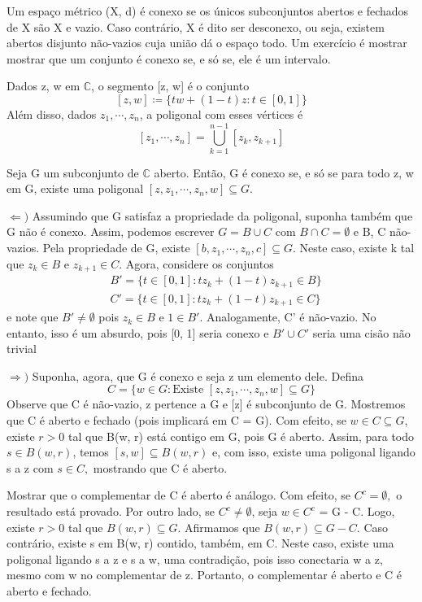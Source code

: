\documentclass[complex.tex]{subfiles}
\begin{document}
Um espaço métrico (X, d) é conexo se os únicos subconjuntos abertos e fechados de X são X e vazio. Caso contrário,
X é dito ser desconexo, ou seja, existem abertos disjunto não-vazios cuja união dá o espaço todo. Um exercício é mostrar
mostrar que um conjunto é conexo se, e só se, ele é um intervalo.

Dados z, w em $\mathbb{C}$, o segmento [z, w] é o conjunto
$$
	[z, w]\coloneqq  \{tw + (1-t)z: t\in[0, 1]\}
$$
Além disso, dados $z _{1}, \cdots, z _{n}$, a poligonal com esses vértices é
$$
	[z _{1}, \cdots, z _{n}] = \bigcup _{k=1}^{n-1}[z _{k}, z _{k+1}]
$$
\begin{prop*}
	Seja G um subconjunto de $\mathbb{C}$ aberto. Então, G é conexo se, e só se para todo z, w em G, existe uma poligonal
	$[z, z _{1}, \cdots, z _{n}, w]\subseteq{G}.$
\end{prop*}
\begin{proof*}
	$\Leftarrow)$ Assumindo que G satisfaz a propriedade da poligonal, suponha também que G não é conexo. Assim,
	podemos escrever $G = B\cup{C}$ com $B\cap{C}=\emptyset$ e B, C não-vazios. Pela propriedade de G, existe
	$[b, z _{1}, \cdots, z _{n}, c]\subseteq{G}$. Neste caso, existe k tal que $z _{k}\in{B}$ e $z _{k+1}\in{C}.$ Agora,
	considere os conjuntos
	\begin{align*}
		 & B' = \{t\in[0, 1]: tz _{k} + (1 - t)z _{k+1}\in{B}\} \\
		 & C' = \{t\in[0, 1]: tz _{k} + (1 - t)z _{k+1}\in{C}\}
	\end{align*}
	e note que $B'\neq{\emptyset}$ pois $z _{k}\in{B}$ e $1\in{B'}$. Analogamente, C' é não-vazio. No entanto, isso é um absurdo,
	pois [0, 1] seria conexo e $B'\cup{C'}$ seria uma cisão não trivial

	$\Rightarrow)$ Suponha, agora, que G é conexo e seja z um elemento dele. Defina
	$$
		C = \{w\in{G}: \text{Existe } [z, z _{1}, \cdots, z _{n}, w]\subseteq{G}\}
	$$
	Observe que C é não-vazio, z pertence a G e [z] é subconjunto de G. Mostremos que C é aberto e fechado (pois implicará em C = G).
	Com efeito, se $w\in{C}\subseteq{G}$, existe $r>0$ tal que B(w, r) está contigo em G, pois G é aberto.
	Assim, para todo $s\in B(w, r)$, temos $[s, w]\subseteq{B(w, r)}$ e, com isso, existe uma poligonal ligando s a z com $s\in{C},$ mostrando
	que C é aberto.

	Mostrar que o complementar de C é aberto é análogo. Com efeito, se $C ^{c} = \emptyset,$ o resultado está provado. Por outro
	lado, se $C ^{c}\neq\emptyset$, seja $w\in{C ^{c}}$ = G - C. Logo, existe $r > 0$ tal que $B(w, r)\subseteq{G}$. Afirmamos
	que $B(w, r)\subseteq{G-C}$. Caso contrário, existe s em B(w, r) contido, também, em C. Neste caso, existe uma poligonal
	ligando s a z e s a w, uma contradição, pois isso conectaria w a z, mesmo com w no complementar de z. Portanto, o complementar
	é aberto e C é aberto e fechado. \qedsymbol
\end{proof*}
\end{document}
